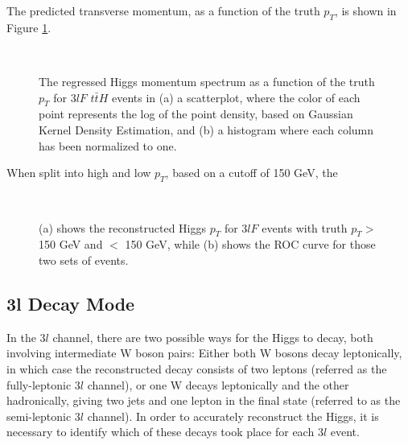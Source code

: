 The predicted transverse momentum, as a function of the truth $p_T$, is shown in Figure \ref{fig:pt3lFresults}.
                                                                                                                             
\begin{figure}[H]
    \centering
    \\                     
    \caption{The regressed Higgs momentum spectrum as a function of the truth $p_T$ for $3lF$ $t\bar{t}H$ events in (a) a scatterplot, where the color of each point represents the log of the point density, based on Gaussian Kernel Density Estimation, and (b) a histogram where each column  has been normalized to one.}
    \label{fig:pt3lFresults}
\end{figure}

When split into high and low $p_T$, based on a cutoff of 150 GeV, the 

\begin{figure}[H]                                                                                                           
    \centering
    \\
    \caption{(a) shows the reconstructed Higgs $p_T$ for $3lF$ events with truth $p_T > $ 150 GeV and $<$ 150 GeV, while (b) shows the ROC curve for those two sets of events.}
    \label{fig:pt3lFroc}
\end{figure}

\subsection{3l Decay Mode}
\label{sec:decay3l}

In the $3l$  channel, there are two possible ways for the Higgs to decay, both involving intermediate W boson pairs: Either both W bosons decay leptonically, in which case the reconstructed decay consists of two leptons (referred as the fully-leptonic $3l$  channel), or one W decays leptonically and the other hadronically, giving two jets and one lepton in the final state (referred to as the semi-leptonic $3l$  channel). In order to accurately reconstruct the Higgs, it is necessary to identify which of these decays took place for each $3l$  event.

